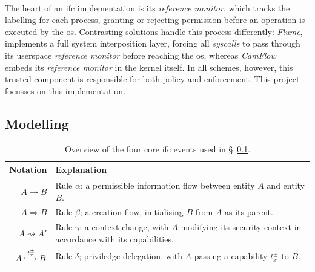 \paragraph{} The heart of an \acrshort{ifc} implementation is its \textit{reference monitor}, which tracks the labelling for each process, granting or rejecting permission before an operation is executed by the \acrshort{os}. Contrasting solutions handle this process differently: \textit{Flume},~\cite{flume} implements a full system interposition layer, forcing all \textit{syscalls} to pass through its userspace \textit{reference monitor} before reaching the \acrshort{os}, whereas \textit{CamFlow}~\cite{camflow} embeds its \textit{reference monitor} in the kernel itself. In all schemes, however, this trusted component is responsible for both policy and enforcement. This project focusses on this implementation.


\subsection{Modelling}
\label{sec:ifc-modelling}

\begin{table}
    \centering
    \newcommand\tableTop{\rule{0pt}{3ex}}
    \newcommand\tableMid{\rule{0pt}{3ex}}
    \newcommand\tableBottom{\rule[-2ex]{0pt}{0pt}}
    \begin{tabular}{r p{10cm}} 
        \hline
        Notation & Explanation \\ [0.1ex] 
        \hline
            \tableTop{$A \rightarrow B$} & \tableTop{Rule $\alpha$; a permissible information flow between entity $A$ and entity $B$.} \\
            
            $A \Rightarrow B$ & \tableMid{Rule $\beta$; a creation flow, initialising $B$ from $A$ as its parent.} \\

            $A \rightsquigarrow A'$ & \tableMid{Rule $\gamma$; a context change, with $A$ modifying its security context in accordance with its capabilities.} \\
            
            $A \xhookrightarrow[]{t^{\pm}_{x}} B$ & \tableMid{Rule $\delta$; priviledge delegation, with $A$ passing a capability $t_{x}^{\pm}$ to $B$.} \tableBottom \\
    \end{tabular}
    \caption[Overview of the four core IFC events]{Overview of the four core \acrshort{ifc} events used in §~\ref{sec:ifc-modelling}.}
    \label{table:ifc-notation}
\end{table}


